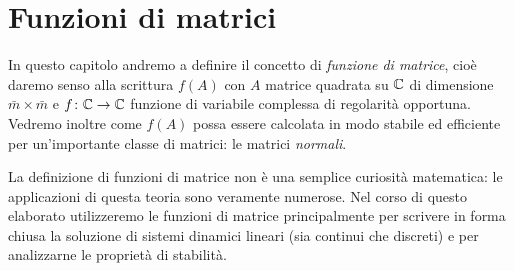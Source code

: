 \graphicspath{{./figures/capitolo4/}}
\lstset{inputpath = ./programs/capitolo4}

\chapter{Funzioni di matrici}
In questo capitolo andremo a definire il concetto di
\emph{funzione di matrice}, cioè daremo senso alla scrittura
$f(A)$ con $A$ matrice quadrata su $\mathbb{C}$ di dimensione~$\bar{m}\times\bar{m}$
e $f \colon \mathbb{C} \to \mathbb{C}$ funzione di variabile complessa
di regolarità opportuna.
Vedremo inoltre come $f(A)$ possa essere calcolata in modo
stabile ed efficiente per un'importante classe di matrici:
le matrici \emph{normali}.

La definizione di funzioni di matrice non è una semplice curiosità
matematica: le applicazioni di questa teoria sono veramente numerose.
Nel corso di questo elaborato utilizzeremo le funzioni di matrice principalmente
per scrivere in forma chiusa la soluzione di sistemi dinamici lineari
(sia continui che discreti) e per analizzarne le proprietà di stabilità.



